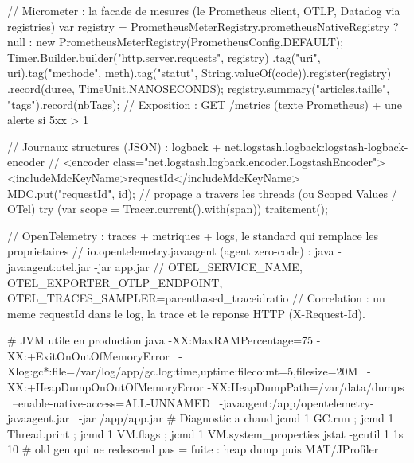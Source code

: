\documentclass[12pt,a4paper,twoside,openright]{book}
\begin{document}
\begin{codejava}
// Micrometer : la facade de mesures (le Prometheus client, OTLP, Datadog via registries)
var registry = PrometheusMeterRegistry.prometheusNativeRegistry ? null : new PrometheusMeterRegistry(PrometheusConfig.DEFAULT);
Timer.Builder.builder("http.server.requests", registry)
        .tag("uri", uri).tag("methode", meth).tag("statut", String.valueOf(code)).register(registry)
        .record(duree, TimeUnit.NANOSECONDS);
registry.summary("articles.taille", "tags").record(nbTags);
// Exposition : GET /metrics (texte Prometheus) + une alerte si 5xx > 1 %

// Journaux structures (JSON) : logback + net.logstash.logback:logstash-logback-encoder
//    <encoder class="net.logstash.logback.encoder.LogstashEncoder"><includeMdcKeyName>requestId</includeMdcKeyName>
MDC.put("requestId", id);                       // propage a travers les threads (ou Scoped Values / OTel)
try (var scope = Tracer.current().with(span)) { traitement(); }

// OpenTelemetry : traces + metriques + logs, le standard qui remplace les proprietaires
// io.opentelemetry.javaagent (agent zero-code) : java -javaagent:otel.jar -jar app.jar
//    OTEL_SERVICE_NAME, OTEL_EXPORTER_OTLP_ENDPOINT, OTEL_TRACES_SAMPLER=parentbased_traceidratio
// Correlation : un meme requestId dans le log, la trace et le reponse HTTP (X-Request-Id).
\end{codejava}

\begin{terminal}
# JVM utile en production
java -XX:MaxRAMPercentage=75 -XX:+ExitOnOutOfMemoryError \
     -Xlog:gc*:file=/var/log/app/gc.log:time,uptime:filecount=5,filesize=20M \
     -XX:+HeapDumpOnOutOfMemoryError -XX:HeapDumpPath=/var/data/dumps \
     --enable-native-access=ALL-UNNAMED \
     -javaagent:/app/opentelemetry-javaagent.jar \
     -jar /app/app.jar
# Diagnostic a chaud
jcmd 1 GC.run ; jcmd 1 Thread.print ; jcmd 1 VM.flags ; jcmd 1 VM.system_properties
jstat -gcutil 1 1s 10            # old gen qui ne redescend pas = fuite : heap dump puis MAT/JProfiler
\end{terminal}
\end{document}
